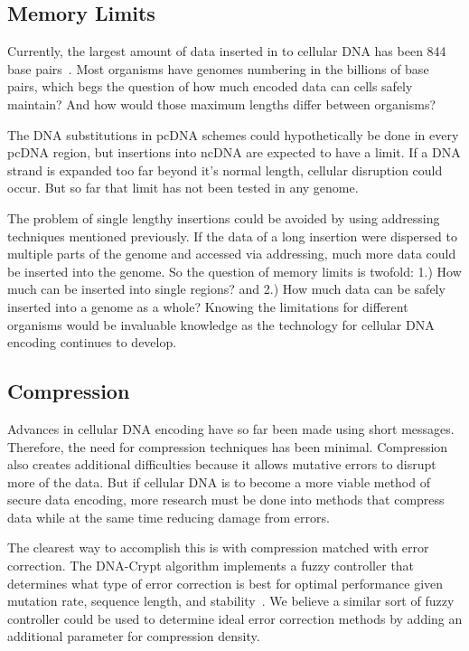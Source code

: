 \documentclass{bioinfo}
\begin{document}
\subsection{Memory Limits}

Currently, the largest amount of data inserted in to cellular DNA has been 844 base pairs~\cite{AR2009BT}. Most organisms have genomes numbering in the billions of base pairs, which begs the question of how much encoded data can cells safely maintain? And how would those maximum lengths differ between organisms?

The DNA substitutions in pcDNA schemes could hypothetically be done in every pcDNA region, but insertions into ncDNA are expected to have a limit. If a DNA strand is expanded too far beyond it's normal length, cellular disruption could occur. But so far that limit has not been tested in any genome.

The problem of single lengthy insertions could be avoided by using addressing techniques mentioned previously. If the data of a long insertion were dispersed to multiple parts of the genome and accessed via addressing, much more data could be inserted into the genome. So the question of memory limits is twofold: 1.) How much can be inserted into single regions? and 2.) How much data can be safely inserted into a genome as a whole? Knowing the limitations for different organisms would be invaluable knowledge as the technology for cellular DNA encoding continues to develop.


\subsection{Compression}

Advances in cellular DNA encoding have so far been made using short messages. Therefore, the need for compression techniques has been minimal. Compression also creates additional difficulties because it allows mutative errors to disrupt more of the data. But if cellular DNA is to become a more viable method of secure data encoding, more research must be done into methods that compress data while at the same time reducing damage from errors.

The clearest way to accomplish this is with compression matched with error correction. The DNA-Crypt algorithm implements a fuzzy controller that determines what type of error correction is best for optimal performance given mutation rate, sequence length, and stability~\cite{HBBMC2007}. We believe a similar sort of fuzzy controller could be used to determine ideal error correction methods by adding an additional parameter for compression density.
\end{document}
